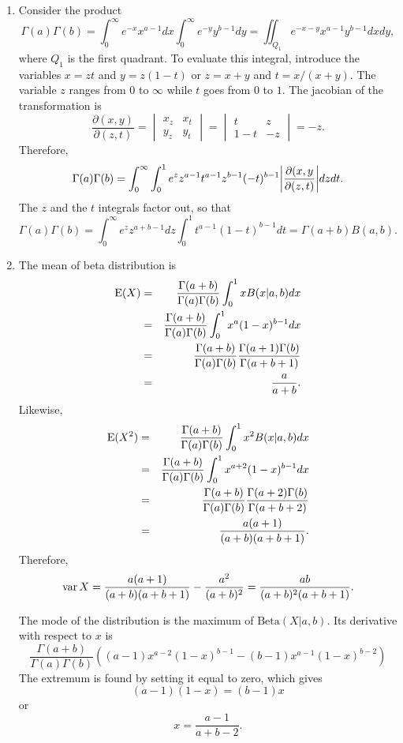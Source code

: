 \begin{enumerate}
\item Consider the product
\[
\Gamma(a)\Gamma(b) = \int_0^\infty e^{-x}x^{a-1}dx\int_0^\infty e^{-y}y^{b-1}dy = \iint_{Q_1}e^{-x-y} x^{a-1}y^{b-1}dxdy,
\]
where $Q_1$ is the first quadrant. To evaluate this integral, introduce the variables $x = zt$
and $y = z(1 - t)$ or $z = x + y$ and $t = x/(x + y)$. The variable $z$ ranges from $0$ to 
$\infty$ while $t$ goes from $0$ to $1$. The jacobian of the transformation is
\[
\frac{\partial(x, y)}{\partial(z, t)} = \begin{vmatrix} x_z & x_t \\ y_z & y_t \end{vmatrix}
= \begin{vmatrix} t & z \\ 1 - t & -z \end{vmatrix} = -z.
\]
Therefore, 
\[
\Gamma(a)\Gamma(b) = \int_0^\infty\int_0^1 e^{z} z^{a-1}t^{a-1}z^{b-1}(-t)^{b-1}\abs*{\frac{\partial(x, y}{\partial(z, t)}}dzdt.
\]
The $z$ and the $t$ integrals factor out, so that
\[
\Gamma(a)\Gamma(b) = \int_0^\infty e^z z^{a+b-1}dz\int_0^1 t^{a-1}(1 - t)^{b- 1}dt = \Gamma(a+b)B(a, b).
\]

\item The mean of beta distribution is
\begin{eqnarray*}
\operatorname{E}(X) &=& \frac{\Gamma(a+b)}{\Gamma(a)\Gamma(b)}\int_0^1 x B(x|a, b)dx \\
 &=& \frac{\Gamma(a+b)}{\Gamma(a)\Gamma(b)}\int_0^1x^a(1 - x)^{b-1}dx \\
 &=& \frac{\Gamma(a+b)}{\Gamma(a)\Gamma(b)}\frac{\Gamma(a+1)\Gamma(b)}{\Gamma(a+b+1)} \\
 &=& \frac{a}{a+b}.
\end{eqnarray*}
Likewise,
\begin{eqnarray*}
\operatorname{E}(X^2) &=& \frac{\Gamma(a+b)}{\Gamma(a)\Gamma(b)}\int_0^1 x^2 B(x|a, b)dx \\
 &=& \frac{\Gamma(a+b)}{\Gamma(a)\Gamma(b)}\int_0^1x^{a+2}(1 - x)^{b-1}dx \\
 &=& \frac{\Gamma(a+b)}{\Gamma(a)\Gamma(b)}\frac{\Gamma(a+2)\Gamma(b)}{\Gamma(a+b+2)} \\
 &=& \frac{a(a+1)}{(a+b)(a+b+1)}.
\end{eqnarray*}
Therefore,
\[
\operatorname{var}{X} = \frac{a(a+1)}{(a+b)(a+b+1)} - \frac{a^2}{(a+b)^2} = \frac{ab}{(a+b)^2(a+b+1)}.
\]

The mode of the distribution is the maximum of $\mathrm{Beta}(X|a, b)$. Its derivative
with respect to $x$ is
\[
\frac{\Gamma(a+b)}{\Gamma(a)\Gamma(b)}\left((a-1)x^{a-2}(1-x)^{b-1} - (b-1)x^{a-1}(1-x)^{b-2}\right)
\]
The extremum is found by setting it equal to zero, which gives
\[
(a-1)(1 - x) = (b - 1)x
\]
or
\[
x = \frac{a-1}{a+b-2}.
\]


\end{enumerate}
